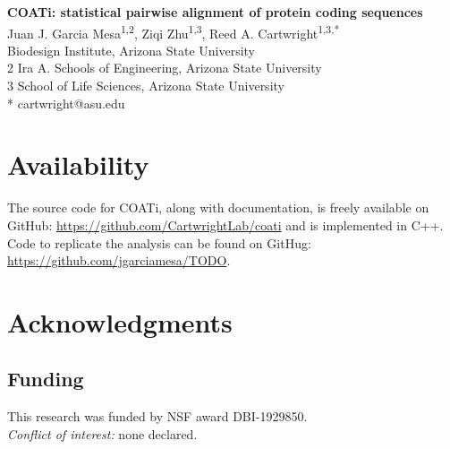 



\begin{flushleft}
{\Large\textbf{COATi: statistical pairwise alignment of protein coding sequences}}
\newline
\\
Juan J. Garcia Mesa\textsuperscript{1,2},
Ziqi Zhu\textsuperscript{1,3},
Reed A. Cartwright\textsuperscript{1,3,*}
\\
 Biodesign Institute, Arizona State University
\\
2 Ira A. Schools of Engineering, Arizona State University
\\
3 School of Life Sciences, Arizona State University
\\
\bigskip
* cartwright@asu.edu

\end{flushleft}



\linenumbers







\section*{Availability}
The source code for COATi, along with documentation, is
freely available on GitHub: \url{https://github.com/CartwrightLab/coati} and is
implemented in C++.
Code to replicate the analysis can be found on GitHug: \url{https://github.com/jgarciamesa/TODO}.


\section*{Acknowledgments}



\subsection*{Funding}
This research was funded by NSF award DBI-1929850.\\

\noindent \textit{Conflict of interest:} none declared.


\printbibliography

\nolinenumbers


